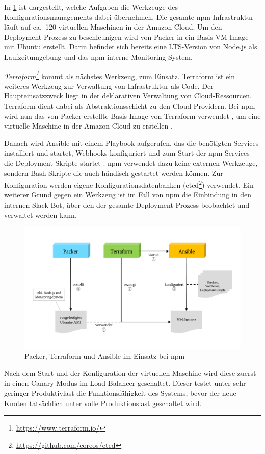 In \cref{fig:configurationtools-npm} ist dargestellt, welche Aufgaben die Werkzeuge des Konfigurationsmanagements dabei übernehmen.
Die gesamte npm-Infrastruktur läuft auf ca.\ 120 virtuellen Maschinen in der Amazon-Cloud.
Um den Deployment-Prozess zu beschleunigen wird von Packer in  ein Basis-VM-Image mit Ubuntu erstellt.
Darin befindet sich bereits eine LTS-Version von Node.js als Laufzeitumgebung und das npm-interne Monitoring-System.

\emph{Terraform\footnote{\url{https://www.terraform.io/}}} kommt als nächstes Werkzeug, zum Einsatz.
Terraform ist ein weiteres Werkzeug zur Verwaltung von Infrastruktur als Code.
Der Haupteinsatzzweck liegt in der deklarativen Verwaltung von Cloud-Ressourcen.
Terraform dient dabei als Abstraktionsschicht zu den Cloud-Providern.
Bei npm wird nun das von Packer erstellte Basis-Image von Terraform verwendet , um eine virtuelle Maschine in der Amazon-Cloud zu erstellen .

Danach wird Ansible mit einem Playbook aufgerufen, das die benötigten Services installiert und startet, Webhooks konfiguriert und zum Start der npm-Services die Deployment-Skripte startet .
npm verwendet dazu keine externen Werkzeuge, sondern Bash-Skripte die auch händisch gestartet werden können.
Zur Konfiguration werden eigene Konfigurationsdatenbanken (etcd\footnote{\url{https://github.com/coreos/etcd}}) verwendet.
Ein weiterer Grund gegen ein Werkzeug ist im Fall von npm die Einbindung in den internen Slack-Bot, über den der gesamte Deployment-Prozess beobachtet und verwaltet werden kann.

\begin{figure}[htbp]
    \centering
    \includegraphics[width=0.9\linewidth,clip]{images/npm-deployment}
    \caption{Packer, Terraform und Ansible im Einsatz bei npm}
\label{fig:configurationtools-npm}
\end{figure}

Nach dem Start und der Konfiguration der virtuellen Maschine wird diese zuerst in einen Canary-Modus im Load-Balancer geschaltet.
Dieser testet unter sehr geringer Produktivlast die Funktionsfähigkeit des Systems, bevor der neue Knoten tatsächlich unter volle Produktionslast geschaltet wird.
